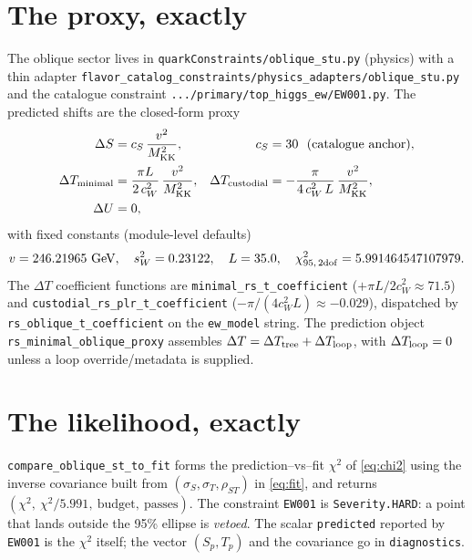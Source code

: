 \documentclass[11pt]{article}
\newcommand{\MKK}{M_{\mathrm{KK}}}
\newcommand{\swsq}{s_W^2}
\newcommand{\cwsq}{c_W^2}
\newcommand{\vev}{v}
\newcommand{\code}[1]{\texttt{#1}}
\theoremstyle{definition}
\begin{document}
\section{The proxy, exactly}
\label{sec:codeproxy}

The oblique sector lives in \code{quarkConstraints/oblique\_stu.py} (physics) with
a thin adapter \code{flavor\_catalog\_constraints/physics\_adapters/oblique\_stu.py}
and the catalogue constraint \code{.../primary/top\_higgs\_ew/EW001.py}. The
predicted shifts are the closed-form proxy
\begin{align}
\Delta S &= c_S\,\frac{\vev^2}{\MKK^2}, & c_S &= 30 \ \ (\text{catalogue anchor}),
\label{eq:codeS}\\
\Delta T_{\rm minimal} &= \frac{\pi L}{2\,\cwsq}\,\frac{\vev^2}{\MKK^2}, &
\Delta T_{\rm custodial} &= -\frac{\pi}{4\,\cwsq\,L}\,\frac{\vev^2}{\MKK^2},
\label{eq:codeT}\\
\Delta U &= 0,
\label{eq:codeU}
\end{align}
with fixed constants (module-level defaults)
\begin{equation}
\vev = 246.21965~\text{GeV},\quad \swsq = 0.23122,\quad L = 35.0,\quad
\chi^2_{95,\,2\rm dof} = 5.991464547107979.
\end{equation}
The $\Delta T$ coefficient functions are \code{minimal\_rs\_t\_coefficient}
($+\pi L/2\cwsq \approx 71.5$) and \code{custodial\_rs\_plr\_t\_coefficient}
($-\pi/(4\cwsq L) \approx -0.029$), dispatched by \code{rs\_oblique\_t\_coefficient}
on the \code{ew\_model} string. The prediction object
\code{rs\_minimal\_oblique\_proxy} assembles
$\Delta T = \Delta T_{\rm tree} + \Delta T_{\rm loop}$, with $\Delta T_{\rm loop}=0$
unless a loop override/metadata is supplied.

\section{The likelihood, exactly}
\label{sec:codelik}

\code{compare\_oblique\_st\_to\_fit} forms the prediction--vs--fit $\chi^2$ of
\eqref{eq:chi2} using the inverse covariance built from
$(\sigma_S,\sigma_T,\rho_{ST})$ in \eqref{eq:fit}, and returns
$(\chi^2,\ \chi^2/5.991,\ \text{budget},\ \text{passes})$. The constraint
\code{EW001} is \code{Severity.HARD}: a point that lands outside the 95\% ellipse
is \emph{vetoed}. The scalar \code{predicted} reported by \code{EW001} is the
$\chi^2$ itself; the vector $(S_p,T_p)$ and the covariance go in
\code{diagnostics}.
\end{document}
